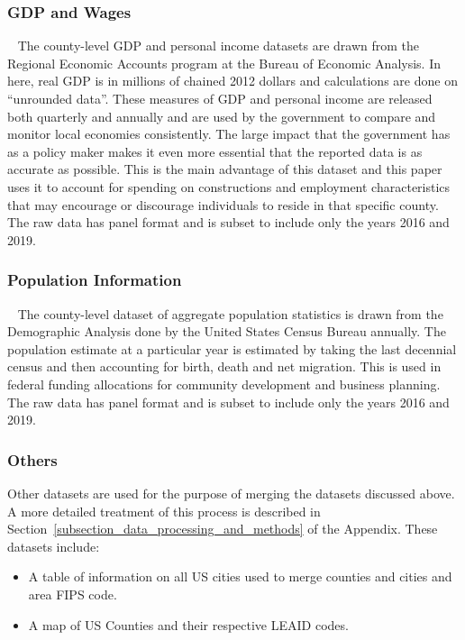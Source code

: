 \subsubsection{GDP and Wages} 
The county-level GDP and personal income datasets are drawn from the Regional Economic Accounts program at the Bureau of Economic Analysis. In here, real GDP is in millions of chained 2012 dollars and calculations are done on “unrounded data”. These measures of GDP and personal income are released both quarterly and annually and are used by the government to compare and monitor local economies consistently. The large impact that the government has as a policy maker makes it even more essential that the reported data is as accurate as possible. This is the main advantage of this dataset and this paper uses it to account for spending on constructions and employment characteristics that may encourage or discourage individuals to reside in that specific county. The raw data has panel format and is subset to include only the years 2016 and 2019. 

\subsubsection{Population Information} 
The county-level dataset of aggregate population statistics is drawn from the Demographic Analysis done by the United States Census Bureau annually. The population estimate at a particular year is estimated by taking the last decennial census and then accounting for birth, death and net migration. This is used in federal funding allocations for community development and business planning. The raw data has panel format and is subset to include only the years 2016 and 2019. 

\subsubsection{Others} 
Other datasets are used for the purpose of merging the datasets discussed above. A more detailed treatment of this process is described in Section~\ref{subsection_data_processing_and_methods} of the Appendix. These datasets include:

\begin{itemize}

    \item A table of information on all US cities used to merge counties and cities and area FIPS code.

    \item A map of US Counties and their respective LEAID codes.

\end{itemize}

